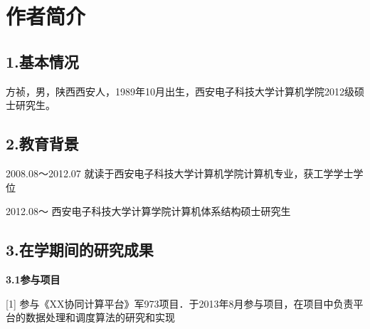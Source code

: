 
\chapter*{作者简介}

\section*{\textbf{1.基本情况}}
方祯，男，陕西西安人，1989年10月出生，西安电子科技大学计算机学院2012级硕士研究生。

\section*{\textbf{2.教育背景}}
2008.08～2012.07  就读于西安电子科技大学计算机学院计算机专业，获工学学士学位

2012.08～        西安电子科技大学计算学院计算机体系结构硕士研究生

\section*{\textbf{3.在学期间的研究成果}}

\textbf{3.1参与项目}

[1] 参与《XX协同计算平台》军973项目．于2013年8月参与项目，在项目中负责平台的数据处理和调度算法的研究和实现


